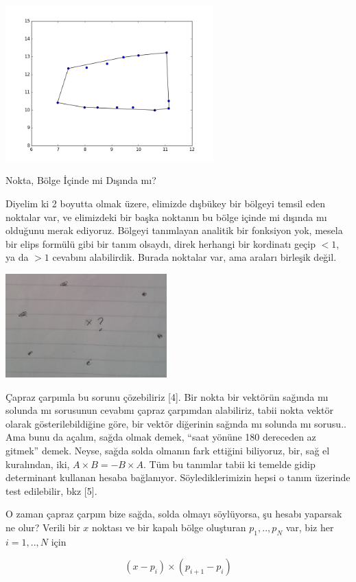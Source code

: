 \documentclass[12pt,fleqn]{article}\usepackage{../../common}
\begin{document}
\includegraphics[height=6cm]{enc_10.png}

Nokta, Bölge İçinde mi Dışında mı?

Diyelim ki 2 boyutta olmak üzere, elimizde dışbükey bir bölgeyi temsil eden
noktalar var, ve elimizdeki bir başka noktanın bu bölge içinde mi dışında
mı olduğunu merak ediyoruz. Bölgeyi tanımlayan analitik bir fonksiyon yok,
mesela bir elips formülü gibi bir tanım olsaydı, direk herhangi bir
kordinatı geçip $<1$, ya da $>1$ cevabını alabilirdik. Burada noktalar var,
ama araları birleşik değil.

\includegraphics[height=4cm]{enc_05.png}

Çapraz çarpımla bu sorunu çözebiliriz [4]. Bir nokta bir vektörün sağında
mı solunda mı sorusunun cevabını çapraz çarpımdan alabiliriz, tabii nokta
vektör olarak gösterilebildiğine göre, bir vektör diğerinin sağında mı
solunda mı sorusu.. Ama bunu da açalım, sağda olmak demek, ``saat yönüne
180 dereceden az gitmek'' demek. Neyse, sağda solda olmanın fark ettiğini
biliyoruz, bir, sağ el kuralından, iki, $A \times B = -B \times A$. Tüm bu
tanımlar tabii ki temelde gidip determinant kullanan hesaba
bağlanıyor. Söylediklerimizin hepsi o tanım üzerinde test edilebilir, bkz
[5].

O zaman çapraz çarpım bize sağda, solda olmayı söylüyorsa, şu hesabı yaparsak ne
olur? Verili bir $x$ noktası ve bir kapalı bölge oluşturan $p_1,..,p_N$ var, biz
her $i = 1,..,N$ için 

$$ (x-p_i) \times (p_{i+1}-p_i) $$
\end{document}
